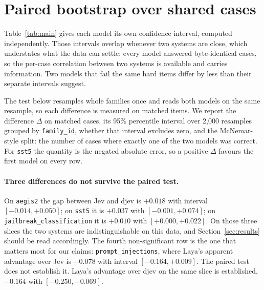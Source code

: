\appendix

\section{Paired bootstrap over shared cases}
\label{app:paired}

Table~\ref{tab:main} gives each model its own confidence interval, computed
independently. Those intervals overlap whenever two systems are close, which
understates what the data can settle: every model answered byte-identical cases,
so the per-case correlation between two systems is available and carries
information. Two models that fail the same hard items differ by less than their
separate intervals suggest.

The test below resamples whole families once and reads both models on the same
resample, so each difference is measured on matched items. We report the
difference $\Delta$ on matched cases, its 95\% percentile interval over 2{,}000
resamples grouped by \texttt{family\_id}, whether that interval excludes zero, and
the McNemar-style split: the number of cases where exactly one of the two models
was correct. For \texttt{sst5} the quantity is the negated absolute error, so a
positive $\Delta$ favours the first model on every row.

\paragraph{Three differences do not survive the paired test.} On
\texttt{aegis2} the gap between Jev and djev is $+0.018$ with interval
$[-0.014, +0.050]$; on \texttt{sst5} it is $+0.037$ with $[-0.001, +0.074]$; on
\texttt{jailbreak\_classification} it is $+0.010$ with $[+0.000, +0.022]$. On
those three slices the two systems are indistinguishable on this data, and
Section~\ref{sec:results} should be read accordingly. The fourth
non-significant row is the one that matters most for our claims:
\texttt{prompt\_injections}, where Laya's apparent advantage over Jev is
$-0.078$ with interval $[-0.164, +0.009]$. The paired test does not establish
it. Laya's advantage over djev on the same slice is established,
$-0.164$ with $[-0.250, -0.069]$.

